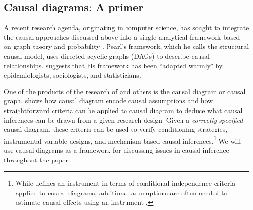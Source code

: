 \documentclass[11pt,reqno,titlepage]{amsart}
\begin{document}
\begin{doublespace}


\subsection{Causal diagrams: A primer}
A recent research agenda, originating in computer science, has sought to integrate the causal approaches discussed above into a single analytical framework based on graph theory and probability \citep{Pearl:2009kh}.
Pearl's framework, which he calls the structural causal model, uses directed acyclic graphs (DAGs) to describe causal relationships.
\citet[p.\,698]{Pearl:2011jd} suggests that his framework has been ``adapted warmly" by epidemiologists, sociologists, and statisticians.

One of the products of the research of \citet{Pearl:2009kh} and others is the causal diagram or causal graph.
\citet{Pearl:2009kh} shows how causal diagram encode causal assumptions and how straightforward criteria  can be applied to causal diagram to deduce what causal inferences can be drawn from a given research design.
Given a \emph{correctly specified} causal diagram, these criteria can be used to verify conditioning strategies, instrumental variable designs, and mechanism-based causal inferences.\footnote{While \citet[p.248]{Pearl:2009kh} defines an instrument in terms of conditional independence criteria applied to causal diagrams, additional assumptions are often needed to estimate causal effects using an instrument \citep{Angrist:1996p7456}.}
We will use causal diagrams as a framework for discussing issues in causal inference throughout the paper.


\end{doublespace}
\end{document}

